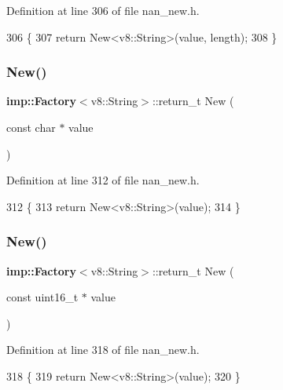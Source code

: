 Definition at line 306 of file nan\+\_\+new.\+h.


\begin{DoxyCode}
306                                         \{
307   \textcolor{keywordflow}{return} New<v8::String>(value, length);
308 \}
\end{DoxyCode}
\mbox{\label{nan__new_8h_accc60720041b481dd2d429dee145e557}} 
\subsubsection{New()\hspace{0.1cm}{\footnotesize\ttfamily [18/22]}}
{\footnotesize\ttfamily \textbf{ imp\+::\+Factory}$<$v8\+::\+String$>$\+::return\+\_\+t New (\begin{DoxyParamCaption}\item[{const char $\ast$}]{value }\end{DoxyParamCaption})}



Definition at line 312 of file nan\+\_\+new.\+h.


\begin{DoxyCode}
312                         \{
313   \textcolor{keywordflow}{return} New<v8::String>(value);
314 \}
\end{DoxyCode}
\mbox{\label{nan__new_8h_a787c3551201eca1833b8e90eebdba5ef}} 
\subsubsection{New()\hspace{0.1cm}{\footnotesize\ttfamily [19/22]}}
{\footnotesize\ttfamily \textbf{ imp\+::\+Factory}$<$v8\+::\+String$>$\+::return\+\_\+t New (\begin{DoxyParamCaption}\item[{const uint16\+\_\+t $\ast$}]{value }\end{DoxyParamCaption})}



Definition at line 318 of file nan\+\_\+new.\+h.


\begin{DoxyCode}
318                             \{
319   \textcolor{keywordflow}{return} New<v8::String>(value);
320 \}
\end{DoxyCode}
\mbox{\label{nan__new_8h_a14a551b6e011e48d2ac398e34fac5528}} 

